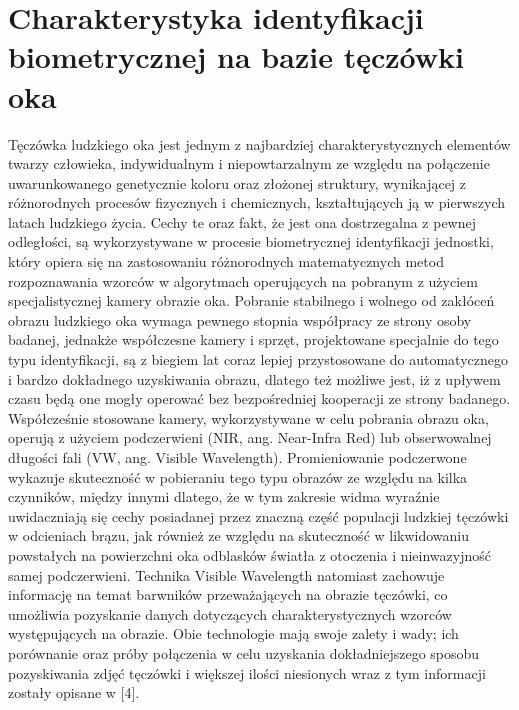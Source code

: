 
\section{Charakterystyka identyfikacji biometrycznej na bazie tęczówki oka}
\label{sec:zawartoscPracy}


Tęczówka ludzkiego oka jest jednym z najbardziej charakterystycznych elementów twarzy człowieka, indywidualnym i niepowtarzalnym ze względu na połączenie uwarunkowanego genetycznie koloru oraz złożonej struktury, wynikającej z różnorodnych procesów fizycznych i chemicznych, kształtujących ją w pierwszych latach ludzkiego życia. Cechy te oraz fakt, że jest ona  dostrzegalna z pewnej odległości, są wykorzystywane w procesie biometrycznej identyfikacji jednostki, który opiera się na zastosowaniu różnorodnych matematycznych metod rozpoznawania wzorców w algorytmach operujących na pobranym z użyciem specjalistycznej kamery obrazie oka.
	Pobranie stabilnego i wolnego od zakłóceń obrazu ludzkiego oka wymaga pewnego stopnia współpracy ze strony osoby badanej, jednakże współczesne kamery i sprzęt, projektowane specjalnie do tego typu identyfikacji, są z biegiem lat coraz lepiej przystosowane do automatycznego i bardzo dokładnego uzyskiwania obrazu, dlatego też możliwe jest, iż z upływem czasu będą one mogły operować bez bezpośredniej kooperacji ze strony badanego.
	Współcześnie stosowane kamery, wykorzystywane w celu pobrania obrazu oka, operują z użyciem podczerwieni (NIR, ang. Near-Infra Red) lub obserwowalnej długości fali (VW, ang. Visible Wavelength). Promieniowanie podczerwone wykazuje skuteczność w pobieraniu tego typu obrazów ze względu na kilka czynników, między innymi dlatego, że w tym zakresie widma wyraźnie uwidaczniają się cechy posiadanej przez znaczną część populacji ludzkiej tęczówki w  odcieniach brązu, jak również ze względu na skuteczność w likwidowaniu powstałych na powierzchni oka odblasków światła z otoczenia i nieinwazyjność samej podczerwieni. Technika Visible Wavelength natomiast zachowuje informację na temat barwników przeważających na obrazie tęczówki, co umożliwia pozyskanie danych dotyczących charakterystycznych wzorców występujących na obrazie. Obie technologie mają swoje zalety i wady; ich porównanie oraz próby połączenia w celu uzyskania dokładniejszego sposobu pozyskiwania zdjęć tęczówki i większej ilości niesionych wraz z tym informacji zostały opisane w [4]. 
